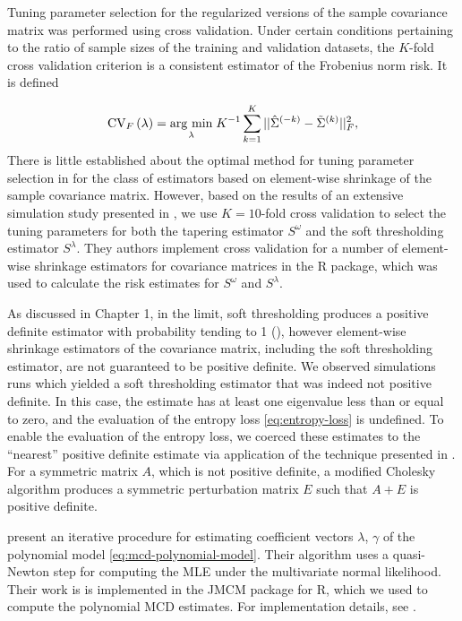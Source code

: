 Tuning parameter selection for the regularized versions of the sample covariance matrix was performed using cross validation. Under certain conditions pertaining to the ratio of sample sizes of the training and validation datasets, the $K$-fold cross validation criterion is a consistent estimator of the Frobenius norm risk. It is defined 

\begin{equation} \label{eq:K-fold-matrix--cv}
\mbox{CV}_F\left(\lambda \right) = \underset{\lambda}{\operatorname{arg}\,\operatorname{min}}\; K^{-1} \sum_{k = 1}^K  \vert \vert\hat{\Sigma}^{\left(-k\right)} - \tilde{\Sigma}^{\left(k\right)}  \vert \vert_F^2, 
\end{equation}
\noindent
There is little established about the optimal method for tuning parameter selection in for the class of estimators based on element-wise shrinkage of the sample covariance matrix.  However, based on the results of an extensive simulation study presented in \cite{fang2016tuning}, we use $K = 10$-fold cross validation to select the tuning parameters for both the tapering estimator $S^\omega$ and the soft thresholding estimator $S^{\lambda}$. They authors implement cross validation for a number of element-wise shrinkage estimators for covariance matrices in the \cite{CVTuningCov} R package, which was used to calculate the risk estimates for $S^{\omega}$ and $S^{\lambda}$. 

\bigskip

As discussed in Chapter 1, in the limit, soft thresholding produces a positive definite estimator with probability tending to 1 (\cite{rothman2009generalized}), however element-wise shrinkage estimators of the covariance matrix, including the soft thresholding estimator, are not guaranteed to be positive definite. We observed simulations runs which yielded a soft thresholding estimator that was indeed not positive definite.  In this case, the estimate has at least one eigenvalue less than or equal to zero, and the evaluation of the entropy loss \ref{eq:entropy-loss} is undefined. To enable the evaluation of the entropy loss, we coerced these estimates to the ``nearest'' positive definite estimate via application of the technique presented in \cite{cheng1998modified}.  For a symmetric matrix $A$, which is not positive definite,  a modified Cholesky algorithm produces a symmetric perturbation matrix $E$ such that $A + E$ is positive definite.

\bigskip

\cite{pan2003modelling} present an iterative procedure for estimating coefficient vectors $\lambda$, $\gamma$ of the polynomial model \ref{eq:mcd-polynomial-model}. Their algorithm uses a quasi-Newton step for computing the MLE under the multivariate normal likelihood. Their work is  is implemented in the JMCM package for \textsf{R}, which we used to compute the polynomial MCD estimates.  For implementation details, see \cite{pan2017jmcm}. 	 


